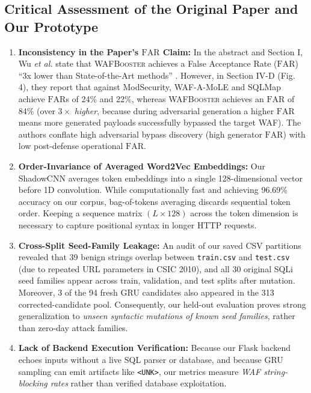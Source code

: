\documentclass[conference]{IEEEtran}
\newcommand{\WAFB}{\textsc{WAFBooster}}
\newcommand{\FAR}{\ensuremath{\mathrm{FAR}}}
\begin{document}
\subsection{Critical Assessment of the Original Paper and Our Prototype}
\begin{enumerate}
    \item \textbf{Inconsistency in the Paper's \FAR{} Claim:} In the abstract and Section I, Wu \emph{et al.} state that \WAFB{} achieves a False Acceptance Rate (\FAR{}) ``3x lower than State-of-the-Art methods'' \cite{wu2025}. However, in Section IV-D (Fig. 4), they report that against ModSecurity, WAF-A-MoLE and SQLMap achieve \FAR{}s of 24\% and 22\%, whereas \WAFB{} achieves an \FAR{} of 84\% (over $3\times$ \emph{higher}, because during adversarial generation a higher \FAR{} means more generated payloads successfully bypassed the target WAF). The authors conflate high adversarial bypass discovery (high generator \FAR{}) with low post-defense operational \FAR{}.
    \item \textbf{Order-Invariance of Averaged Word2Vec Embeddings:} Our ShadowCNN averages token embeddings into a single 128-dimensional vector before 1D convolution. While computationally fast and achieving 96.69\% accuracy on our corpus, bag-of-tokens averaging discards sequential token order. Keeping a sequence matrix $(L \times 128)$ across the token dimension is necessary to capture positional syntax in longer HTTP requests.
    \item \textbf{Cross-Split Seed-Family Leakage:} An audit of our saved CSV partitions revealed that 39 benign strings overlap between \texttt{train.csv} and \texttt{test.csv} (due to repeated URL parameters in CSIC 2010), and all 30 original SQLi seed families appear across train, validation, and test splits after mutation. Moreover, 3 of the 94 fresh GRU candidates also appeared in the 313 corrected-candidate pool. Consequently, our held-out evaluation proves strong generalization to \emph{unseen syntactic mutations of known seed families}, rather than zero-day attack families.
    \item \textbf{Lack of Backend Execution Verification:} Because our Flask backend echoes inputs without a live SQL parser or database, and because GRU sampling can emit artifacts like \texttt{<UNK>}, our metrics measure \emph{WAF string-blocking rates} rather than verified database exploitation.
\end{enumerate}
\end{document}
